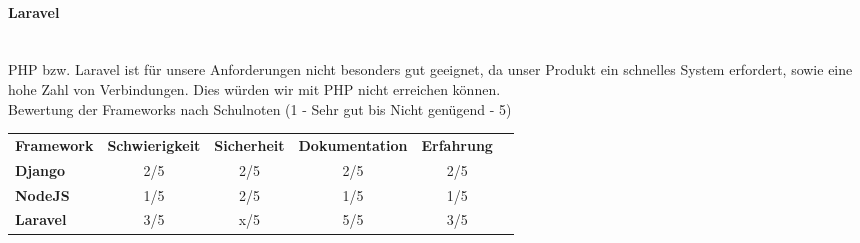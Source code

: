 \documentclass[11pt]{article}
\begin{document}
\paragraph{Laravel} \mbox{}\\
PHP bzw. Laravel ist für unsere Anforderungen nicht besonders gut geeignet, da unser Produkt ein schnelles System erfordert, sowie eine hohe Zahl von Verbindungen. Dies würden wir mit PHP nicht erreichen können.
\\

Bewertung der Frameworks nach Schulnoten (1 - Sehr gut bis Nicht genügend - 5)
\begin{table}[ht]
\centering
\begin{tabular}{|l|c|c|c|c|l}
\cline{1-5}
\textbf{Framework} & \multicolumn{1}{l|}{\textbf{Schwierigkeit}} & \multicolumn{1}{l|}{\textbf{Sicherheit}} & \multicolumn{1}{l|}{\textbf{Dokumentation}} & \multicolumn{1}{l|}{\textbf{Erfahrung}} & \\ \cline{1-5}
\textbf{Django}    & 2/5                                         & 2/5                                      & 2/5                                         & 2/5                                     & \\ \cline{1-5}
\textbf{NodeJS}    & 1/5                                         & 2/5                                      & 1/5                                         & 1/5                                     & \\ \cline{1-5}
\textbf{Laravel}   & 3/5                                         & x/5                                      & 5/5                                         & 3/5                                     & \\ \cline{1-5}
\end{tabular}
\end{table}
\newpage
\end{document}
